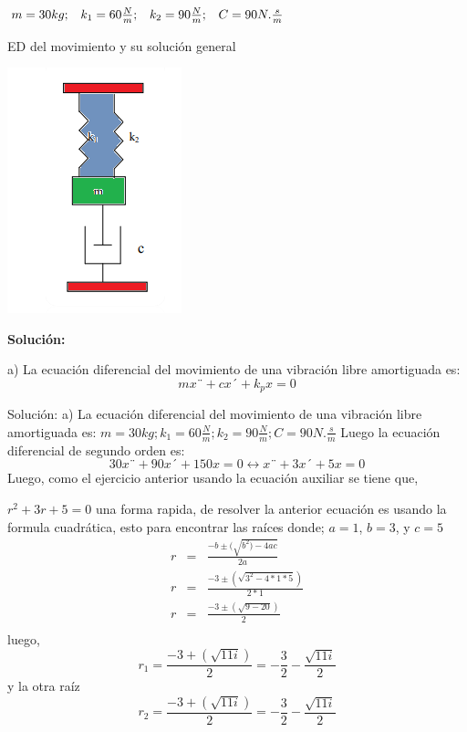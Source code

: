 \documentclass[oneside,12pt]{report}
\begin{document}
\begin{center}
	$m=30kg; \hspace{0.3cm}k_1=60 \frac{N}{m};\hspace{0.3cm} k_2=90 \frac{N}{m};\hspace{0.3cm} C=90 N.\frac{s}{m}$
\end{center}

ED del movimiento y su solución general

\begin{center}
	\includegraphics[width=0.4\linewidth]{EJERCIIO2}
\end{center}

\begin{center}
	\textbf{Solución:}
\end{center}

a)	La ecuación diferencial del movimiento de una vibración libre amortiguada es:
\begin{equation}
	mx¨+cx´+k_px=0
\end{equation}

Solución:
a)	La ecuación diferencial del movimiento de una vibración libre amortiguada es:
$m=30kg; k_1=60 \frac{N}{m}; k_2=90 \frac{N}{m}; C=90 N.\frac{s}{m}$
Luego la ecuación diferencial de segundo orden es:
\begin{equation}
	30x¨+90x´+150x=0\leftrightarrow x¨+3x´+5x=0
\end{equation}
Luego, como el ejercicio anterior usando la ecuación auxiliar se tiene que,

$r^{2}+3r+5=0$
una forma rapida, de resolver la anterior ecuación es usando la formula cuadrática, esto  para encontrar las raíces  donde; $a=1$, $b=3$, y $c=5$
$$\begin{array}{ccc}
	r&=&\frac{-b\pm(\sqrt{b^{2})-4ac}}{2a}\\
	r&=&\frac{-3\pm(\sqrt{3^{2}-4*1*5})}{2*1}\\
	r&=&\frac{-3\pm(\sqrt{9-20})}{2}\\
\end{array}$$
luego,
$$r_1=\frac{-3+(\sqrt{11i})}{2}=-\frac{3}{2}-\frac{\sqrt{11i}}{2}$$
y la otra raíz
$$r_2=\frac{-3+(\sqrt{11i})}{2}=-\frac{3}{2}-\frac{\sqrt{11i}}{2}$$
\end{document}
